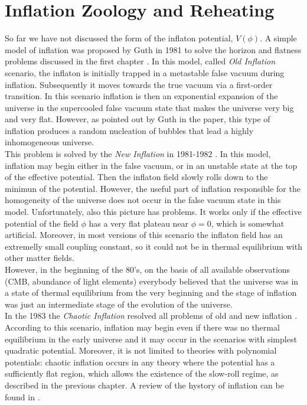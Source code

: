 \documentclass[11pt,a4paper,twoside]{book}
\begin{document}
\chapter{Inflation Zoology and Reheating}
So far we have not discussed the form of the inflaton potential, $ V(\phi) $. A simple model of inflation was proposed by Guth in 1981 to solve the horizon and flatness problems discussed in the first chapter \cite{Guth:Intro}.
In this model, called  \textit{Old Inflation} scenario, the inflaton is initially trapped in a metastable false vacuum during inflation. Subsequently  it moves towards the true vacuum via a first-order transition. In this scenario inflation is then an exponential expansion of the universe in the supercooled false vacuum state that makes the universe very big and very flat. However, as pointed out by Guth in the paper, this type of inflation produces a random nucleation of bubbles that lead a highly inhomogeneous universe.\\
This problem is solved by the \textit{New Inflation} in 1981-1982 \cite{Chap2: Linde_NewInflation} . In this model, inflation may begin either in the false vacuum, or in an unstable state at the top of the effective potential. Then the inflaton field slowly rolls down to the minimun of the  potential. However, the useful part of inflation responsible for the homogeneity of the universe does not occur in the false vacuum state in this model. Unfortunately, also this picture has problems. It works only if the effective potential of the field $ \phi $ has a very flat plateau near $\phi=0$, which is somewhat artificial. Moreover, in most versions of this scenario the inflaton field  has an extremelly small coupling constant, so it could not be in thermal equilibrium  with other matter fields.\\
However, in the beginning of the 80's, on the basis of all available observations (CMB, abundance of light elements) everybody believed that the universe was in a state of thermal equilibrium from the very beginning and the stage of inflation was just an intermediate stage of the evolution of the universe.\\
In the 1983 the \textit{Chaotic Inflation} resolved all problems of old and new inflation \cite{ChaoticInflationLinde:Chap2}. According to this scenario, inflation may begin even if there was no thermal equilibrium in the early universe and it may occur in the scenarios with simplest quadratic potential. Moreover, it is not limited to theories with polynomial potentials: chaotic inflation occurs in any theory where the potential has a sufficiently flat region, which allows the existence of the slow-roll regime, as described in the previous chapter. A review of the hystory of inflation can be found in \cite{Chap2:Linde_HystoryInflation}.  \\
\end{document}

